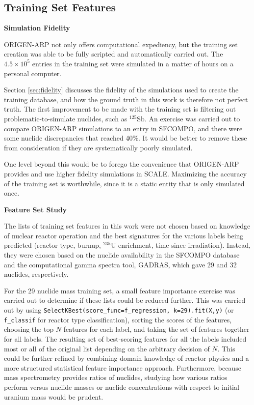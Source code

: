 \subsection{Training Set Features}

\noindent \textbf{Simulation Fidelity}

\gls{ORIGEN-ARP} not only offers computational expediency, but the training set
creation was able to be fully scripted and automatically carried out. The $4.5
\times 10^5$ entries in the training set were simulated in a matter of hours on
a personal computer.  

Section \ref{sec:fidelity} discusses the fidelity of the simulations used to
create the training database, and how the ground truth in this work is
therefore not perfect truth.  The first improvement to be made with the
training set is filtering out problematic-to-simulate nuclides, such as
${}^{125}\text{Sb}$. An exercise was carried out to compare \gls{ORIGEN-ARP}
simulations to an entry in \gls{SFCOMPO}, and there were some nuclide
discrepancies that reached 40\%. It would be better to remove these from
consideration if they are systematically poorly simulated.

One level beyond this would be to forego the convenience that \gls{ORIGEN-ARP}
provides and use higher fidelity simulations in \gls{SCALE}.  Maximizing the
accuracy of the training set is worthwhile, since it is a static entity that is
only simulated once. 

\noindent \textbf{Feature Set Study}

The lists of training set features in this work were not chosen based on
knowledge of nuclear reactor operation and the best signatures for the various
labels being predicted (reactor type, burnup, ${}^{235}\text{U}$ enrichment,
time since irradiation).  Instead, they were chosen based on the nuclide
availability in the \gls{SFCOMPO} database and the computational gamma spectra
tool, \gls{GADRAS}, which gave 29 and 32 nuclides, respectively. 

For the 29 nuclide mass training set, a small feature importance exercise was
carried out to determine if these lists could be reduced further. This was
carried out by using \texttt{SelectKBest(score\_func=f\_regression,
k=29).fit(X,y)} (or \texttt{f\_classif} for reactor type classification),
sorting the scores of the features, choosing the top $N$ features for each
label, and taking the set of features together for all labels.  The resulting
set of best-scoring features for all the labels included most or all of the
original list depending on the arbitrary decision of $N$.  This could be
further refined by combining domain knowledge of reactor physics and a more
structured statistical feature importance approach. Furthermore, because mass
spectrometry provides ratios of nuclides, studying how various ratios perform
versus nuclide masses or nuclide concentrations with respect to initial uranium
mass would be prudent. 

